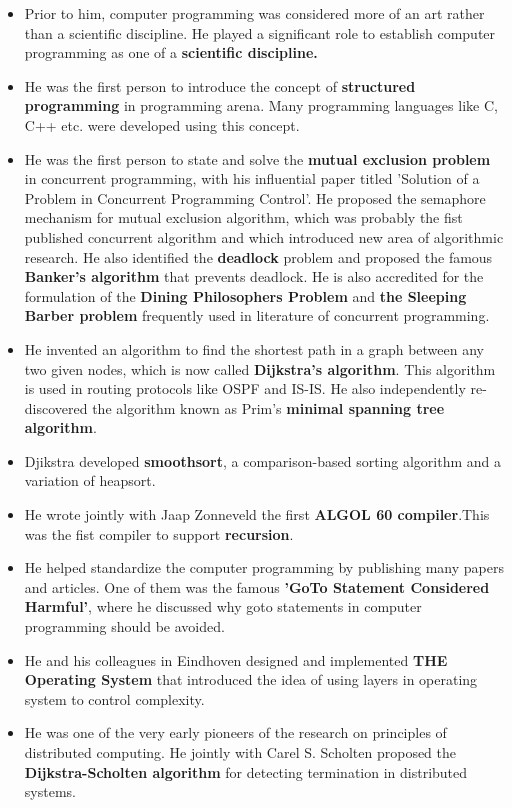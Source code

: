 \documentclass [12pt, a4paper]{article}
\begin{document}
\begin{itemize}

	\item Prior to him, computer programming was considered more of an art rather than a scientific discipline. He played a significant role to establish computer programming as one of a \textbf{scientific discipline.}
	\item He was the first person to introduce the concept of \textbf{structured programming} in programming arena. Many programming languages like C, C++ etc. were developed using this concept.
	\item He was the first person to state and solve the \textbf{mutual exclusion problem} in concurrent programming, with his influential paper titled 'Solution of a Problem in Concurrent Programming Control'. He proposed the semaphore mechanism for mutual exclusion algorithm, which was probably the fist published concurrent algorithm and which introduced new area of algorithmic research. He also identified the \textbf{deadlock} problem and proposed the famous \textbf{Banker's algorithm} that prevents deadlock. He is also accredited for the formulation of the \textbf{Dining Philosophers Problem} and \textbf{the Sleeping Barber problem} frequently used in literature of concurrent programming.
	\item He invented an algorithm to find the shortest path in a graph between any two given nodes, which is now called \textbf{Dijkstra's algorithm}. This algorithm is used in routing protocols like OSPF and IS-IS. He also independently re-discovered the algorithm known as Prim's \textbf{minimal spanning tree algorithm}.
	\item Djikstra developed \textbf{smoothsort}, a comparison-based sorting algorithm and a variation of heapsort.
	\item He wrote jointly with Jaap Zonneveld the first \textbf{ALGOL 60 compiler}.This was the fist compiler to support \textbf{recursion}.
	\item He helped standardize the computer programming by publishing many papers and articles. One of them was the famous \textbf{'GoTo Statement Considered Harmful'}, where he discussed why goto statements in computer programming should be avoided.
	\item He and his colleagues in Eindhoven designed and implemented \textbf{THE Operating System} that introduced the idea of using layers in operating system to control complexity.
	\item He was one of the very early pioneers of the research on principles of distributed computing. He jointly with Carel S. Scholten proposed the \textbf{Dijkstra-Scholten algorithm} for detecting termination in distributed systems.
	
\end{itemize}
\end{document}
